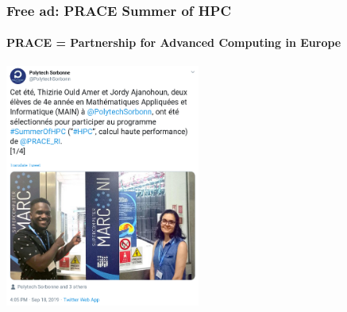 \documentclass[10pt]{beamer}
\begin{document}

\begin{frame}
   \frametitle{Free ad: PRACE Summer of HPC}
   \framesubtitle{PRACE = Partnership for Advanced Computing in Europe}
   \centering
   \includegraphics[height=8cm]{PRACE_twitter.png}
 \end{frame}
\end{document}
